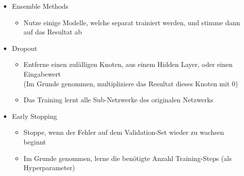 \documentclass[a4paper]{article}
\begin{document}
		\begin{itemize}
			\item Ensemble Methods
				\begin{itemize}
					\item Nutze einige Modelle, welche separat trainiert werden, und stimme dann auf das Resultat ab
				\end{itemize}
			\item Dropout
				\begin{itemize}
					\item Entferne einen zufälligen Knoten, aus einem Hidden Layer, oder einen Eingabewert \\
						(Im Grunde genommen, multipliziere das Resultat dieses Knoten mit 0)
					\item Das Training lernt alle Sub-Netzwerke des originalen Netzwerks
				\end{itemize}
			\item Early Stopping
				\begin{itemize}
					\item Stoppe, wenn der Fehler auf dem Validation-Set wieder zu wachsen beginnt
					\item Im Grunde genommen, lerne die benötigte Anzahl Training-Steps (als Hyperparameter)
				\end{itemize}
		\end{itemize}
	
\end{document}
